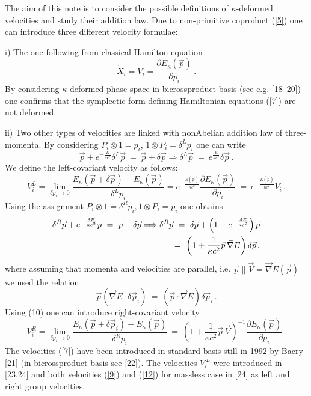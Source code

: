 \documentclass[a4paper,12pt]{article}
\begin{document}
The aim of this note is  to consider the  possible definitions of
$\kappa$-deformed velocities and study their addition law. Due to
non-primitive coproduct (\ref{5}) one can introduce three
different  velocity formulae:

i) The one following from classical Hamilton equation
\begin{equation}\label{7}
\dot{X}_i = V_i = \frac{\partial E_\kappa ( \vec{p})}{\partial
p_i}\, .
\end{equation}
By considering  $\kappa$-deformed phase space in bicrossproduct
basis (see e.g. [18--20]) one confirms that the symplectic form
defining Hamiltonian equations (\ref{7}) are not deformed.

ii) Two other types of velocities are linked with  nonAbelian
addition law of three-momenta. By considering $P_i \otimes 1 =
p_i$, $1\otimes P_i = \delta^L p_i$ one can write
\begin{equation}\label{8}
\vec{p} + e^{-\frac{E}{\kappa c^2}}\delta^L \vec{p} \ = \ \vec{p}
+ \delta \vec{p}\Rightarrow \delta^L \vec{p} \ = \
e^\frac{E}{\kappa c^2} \delta \vec{p}\, .
\end{equation}
We define the left-covariant velocity as follows:
\begin{equation}\label{9} V_i^{L} =
\lim\limits_{\delta  p_i \to 0} \frac{E_\kappa(\vec{p}+
\delta\vec{p}) - E_\kappa(\vec{p})}{\delta^L p_i} =
e^{-\frac{E(\vec{p})}{\kappa c^2}}\frac{\partial E_\kappa (
\vec{p})}{\partial p_i} \ = \ e^{-\frac{E(\vec{p})}{\kappa c^2}}
V_i  \, .
\end{equation}
Using the assignment $P_i\otimes 1 = \delta^R p_i, 1\otimes P_i =
p_i$ one obtains
\begin{eqnarray}\label{10}\delta^R \vec{p} +
e^{-\frac{\delta E}{\kappa c^2}} \vec{p} \ = \ \vec{p} + \delta
\vec{p}\Longrightarrow  \delta^R \vec{p} \  = \ \delta \vec{p} +
\left(1- e^{-\frac{\delta E}{\kappa c^2}}\right) \vec{p} \cr = \
\left(1 + \frac{1}{\kappa c^2} \vec{p}\,\vec{\nabla}
E\right)\delta \vec{p}\, .
\end{eqnarray}
where assuming that momenta and velocities are parallel, i.e.
$\vec{p}\parallel \vec{V}=\vec{\nabla} E(\vec{p})$ we used the
relation
\begin{equation}\label{11}\vec{p} (\vec{\nabla}E\cdot
\delta \vec{p}_i) \ = \ (\vec{p}\cdot \vec{\nabla}E)\delta
\vec{p}_i\, .
\end{equation}
Using (10) one can introduce right-covariant velocity
\begin{equation}\label{12} V_i^{R} =
\lim\limits_{\delta  p_i \to 0} \frac{E_\kappa(\vec{p}+ \delta
\vec{p}_i) - E_\kappa(\vec{p})}{\delta^R p_i} \ = \ \left(1 +
\frac{1}{\kappa c^2}\vec{p}{\,} \vec{V}\right)^{-1}\frac{\partial
E_\kappa ( \vec{p})}{\partial p_i}\, .
\end{equation}
The velocities (\ref{7}) have been introduced in standard basis
still in 1992 by Bacry [21] (in bicrossproduct basis see [22]).
The velocities $V_i^{\ L}$ were introduced  in [23,24] and both
velocities (\ref{9}) and (\ref{12}) for massless case in [24] as
left and right group  velocities.
\end{document}
